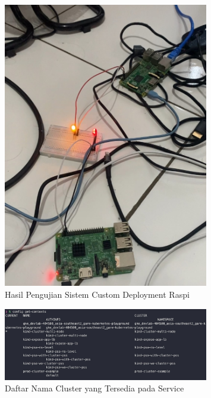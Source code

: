 \begin{figure}[ht]
  \centering
  \includegraphics[width=0.8\textwidth]{resources/chapter-4/pengujian/pengujian-sistem-raspi-hasil-b.jpg}
  \caption{Hasil Pengujian Sistem Custom Deployment Raspi}
  \label{fig:hasil-pengujian-sistem-raspi-custom}
\end{figure}

\begin{figure}[ht]
  \centering
  \includegraphics[width=0.8\textwidth]{resources/chapter-4/pengujian/p00.jpg}
  \caption{Daftar Nama Cluster yang Tersedia pada Service}
  \label{fig:list-cluster-tersedia}
\end{figure}


